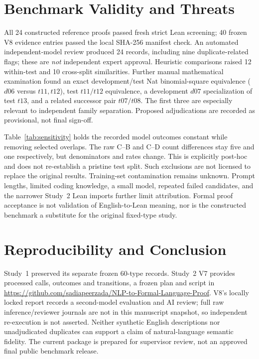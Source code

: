 \documentclass[runningheads,a4paper]{llncs}
\begin{document}
\section{Benchmark Validity and Threats}
All 24 constructed reference proofs passed fresh strict Lean screening;
40 frozen V8 evidence entries passed the local SHA-256 manifest check.
An automated independent-model review produced 24 records, including
nine duplicate-related flags; these are \emph{not} independent expert
approval. Heuristic comparisons raised 12 within-test and 10
cross-split similarities. Further manual mathematical examination found
an exact development/test Nat binomial-square equivalence ($d06$ versus
$t11,t12$), test $t11/t12$ equivalence, a development $d07$ specialization
of test $t13$, and a related successor pair $t07/t08$. The first three
are especially relevant to independent family separation. Proposed
adjudications are recorded as provisional, not final sign-off.

Table~\ref{tab:sensitivity} holds the recorded model outcomes constant
while removing selected overlaps. The raw C--B and C--D count differences
stay five and one respectively, but denominators and rates change. This
is explicitly post-hoc and does not re-establish a pristine test split.
Such exclusions are not licensed to replace the original results.
Training-set contamination remains unknown. Prompt lengths, limited
coding knowledge, a small model, repeated failed candidates, and the
narrower Study~2 Lean imports further limit attribution. Formal proof
acceptance is not validation of English-to-Lean meaning, nor is the
constructed benchmark a substitute for the original fixed-type study.

\section{Reproducibility and Conclusion}
Study~1 preserved its separate frozen 60-type records. Study~2 V7
provides processed calls, outcomes and transitions, a frozen plan and
script in \url{https://github.com/sadiapeerzada/NLP-to-Formal-Language-Proof}.
V8's locally locked report records a second-model evaluation and AI
review; full raw inference/reviewer journals are not in this manuscript
snapshot, so independent re-execution is not asserted. Neither synthetic
English descriptions nor unadjudicated duplicates can support a claim
of natural-language semantic fidelity. The current package is prepared
for supervisor review, not an approved final public benchmark release.
\end{document}
